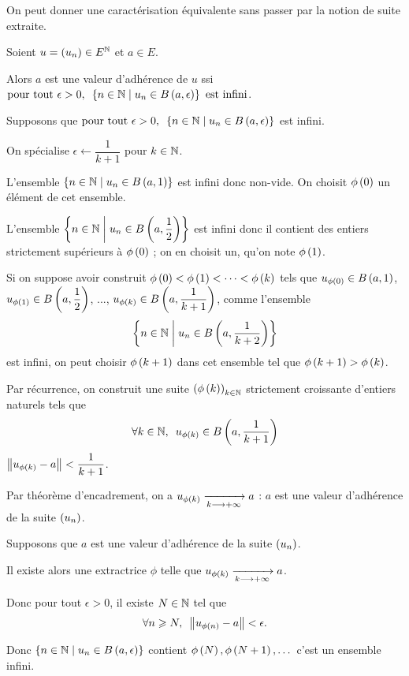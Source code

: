 On peut donner une caractérisation équivalente sans passer par la notion de suite extraite.

\begin{prop}
Soient \(u=\left(u_n\right)\in E^{\mathbb{N}}\) et \(a\in E\).

Alors \(a\) est une valeur d'adhérence de \(u\) ssi \(\quantifs{\tpt\epsilon>0}\accol{n\in\N\tq u_n\in\bouleo{a}{\epsilon}}\text{ est infini}\).
\end{prop}

\begin{dem}
\imprec

Supposons que \(\quantifs{\tpt\epsilon>0}\accol{n\in\N\tq u_n\in\bouleo{a}{\epsilon}}\) est infini.

On spécialise \(\epsilon\gets\dfrac{1}{k+1}\) pour \(k\in\mathbb{N}\).

L'ensemble \(\accol{n\in\N\tq u_n\in\bouleo{a}{1}}\) est infini donc non-vide. On choisit \(\phi\left(0\right)\) un élément de cet ensemble.

L'ensemble \(\accol{n\in\N\tq u_n\in\bouleo{a}{\dfrac{1}{2}}}\) est infini donc il contient des entiers strictement supérieurs à \(\phi\left(0\right)\) ; on en choisit un, qu'on note \(\phi\left(1\right)\).

Si on suppose avoir construit \(\phi\left(0\right)<\phi\left(1\right)<\dots<\phi\left(k\right)\) tels que \(u_{\phi\paren{0}}\in\bouleo{a}{1}\), \(u_{\phi\paren{1}}\in\bouleo{a}{\dfrac{1}{2}}\), ..., \(u_{\phi\paren{k}}\in\bouleo{a}{\dfrac{1}{k+1}}\), comme l'ensemble \[\accol{n\in\N\tq u_n\in\bouleo{a}{\dfrac{1}{k+2}}}\] est infini, on peut choisir \(\phi\left(k+1\right)\) dans cet ensemble tel que \(\phi\left(k+1\right)>\phi\left(k\right)\).

Par récurrence, on construit une suite \(\left(\phi\left(k\right)\right)_{k\in\mathbb{N}}\) strictement croissante d'entiers naturels tels que \[\quantifs{\forall k\in\N}u_{\phi\paren{k}}\in\bouleo{a}{\dfrac{1}{k+1}}\] \ie \(\norme{u_{\phi\paren{k}}-a}<\dfrac{1}{k+1}\).

Par théorème d'encadrement, on a \(u_{\phi\left(k\right)}\xrightarrow[k\longrightarrow+\infty]{}a\) : \(a\) est une valeur d'adhérence de la suite \(\left(u_n\right)\).

\impdir

Supposons que \(a\) est une valeur d'adhérence de la suite \(\left(u_n\right)\).

Il existe alors une extractrice \(\phi\) telle que \(u_{\phi\left(k\right)}\xrightarrow[k\longrightarrow+\infty]{}a\).

Donc pour tout \(\epsilon>0\), il existe \(N\in\mathbb{N}\) tel que \[\quantifs{\forall n\geq N}\norme{u_{\phi\paren{n}}-a}<\epsilon.\]

Donc \(\accol{n\in\N\tq u_n\in\bouleo{a}{\epsilon}}\) contient \(\phi\left(N\right),\phi\left(N+1\right),\dots\) \ie c'est un ensemble infini.
\end{dem}

